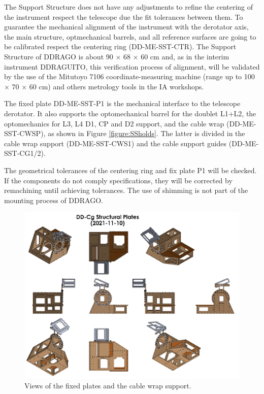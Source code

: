 \documentclass{report}
\begin{document}
The Support Structure does not have any adjustments to refine the centering of the instrument respect the telescope due the fit tolerances between them.  To guarantee the mechanical alignment of the instrument with the derotator axis, the main structure, optmechanical barrels, and all reference surfaces are going to be calibrated respect the centering ring (DD-ME-SST-CTR). The Support Structure of DDRAGO is about 90 × 68 × 60 cm and, as in the interim instrument DDRAGUITO, this verification process of alignment, will be validated by the use of the Mitutoyo 7106 coordinate-measuring machine (range up to 100 × 70 × 60 cm) and others metrology tools in the IA workshops. 

The fixed plate DD-ME-SST-P1 is the mechanical interface to the telescope derotator. It also supports the optomechanical barrel for the doublet L1+L2, the optomechanics for L3, L4 D1, CP and D2 support, and the cable wrap (DD-ME-SST-CWSP), as shown in Figure \ref{figure:SSholds}. The latter is divided in the cable wrap support (DD-ME-SST-CWS1) and the cable support guides (DD-ME-SST-CG1/2).

The geometrical tolerances of the centering ring and fix plate P1 will be checked. If the components do not comply specifications, they will be corrected by remachining until achieving tolerances. The use of shimming is not part of the mounting process of DDRAGO.

\begin{figure}
\centering
\includegraphics[width=1\linewidth]{figures/SSfixedplates.png}
\caption{Views of the fixed plates and the cable wrap support.}
\label{figure:SSfixedplates}
\end{figure}
\end{document}
